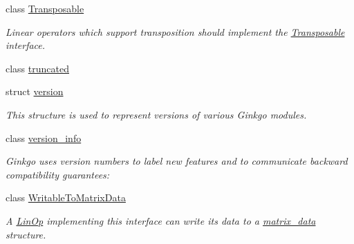 \begin{DoxyCompactItemize}
class \hyperlink{classgko_1_1Transposable}{Transposable}
\begin{DoxyCompactList}\small\item\em Linear operators which support transposition should implement the \hyperlink{classgko_1_1Transposable}{Transposable} interface. \end{DoxyCompactList}\item 
class \hyperlink{classgko_1_1truncated}{truncated}
\item 
struct \hyperlink{structgko_1_1version}{version}
\begin{DoxyCompactList}\small\item\em This structure is used to represent versions of various Ginkgo modules. \end{DoxyCompactList}\item 
class \hyperlink{classgko_1_1version__info}{version\+\_\+info}
\begin{DoxyCompactList}\small\item\em Ginkgo uses version numbers to label new features and to communicate backward compatibility guarantees\+: \end{DoxyCompactList}\item 
class \hyperlink{classgko_1_1WritableToMatrixData}{Writable\+To\+Matrix\+Data}
\begin{DoxyCompactList}\small\item\em A \hyperlink{classgko_1_1LinOp}{Lin\+Op} implementing this interface can write its data to a \hyperlink{structgko_1_1matrix__data}{matrix\+\_\+data} structure. \end{DoxyCompactList}\end{DoxyCompactItemize}
